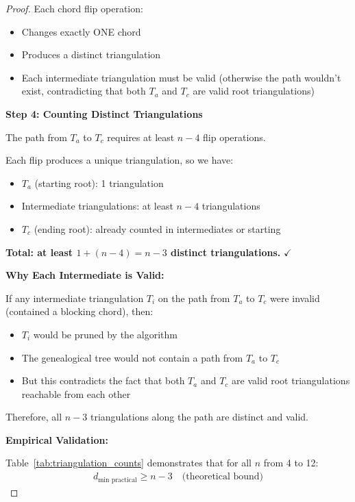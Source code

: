 \documentclass[12pt,a4paper]{article}
\theoremstyle{definition}
\theoremstyle{remark}
\begin{document}
\begin{proof}
Each chord flip operation:
\begin{itemize}
    \item Changes exactly ONE chord
    \item Produces a distinct triangulation
    \item Each intermediate triangulation must be valid (otherwise the path wouldn't exist, contradicting that both $T_a$ and $T_c$ are valid root triangulations)
\end{itemize}

\textbf{Step 4: Counting Distinct Triangulations}

The path from $T_a$ to $T_c$ requires at least $n - 4$ flip operations.

Each flip produces a unique triangulation, so we have:
\begin{itemize}
    \item $T_a$ (starting root): 1 triangulation
    \item Intermediate triangulations: at least $n - 4$ triangulations  
    \item $T_c$ (ending root): already counted in intermediates or starting
\end{itemize}

\textbf{Total: at least $1 + (n-4) = n - 3$ distinct triangulations.} $\checkmark$

\textbf{Why Each Intermediate is Valid:}

If any intermediate triangulation $T_i$ on the path from $T_a$ to $T_c$ were invalid (contained a blocking chord), then:
\begin{itemize}
    \item $T_i$ would be pruned by the algorithm
    \item The genealogical tree would not contain a path from $T_a$ to $T_c$
    \item But this contradicts the fact that both $T_a$ and $T_c$ are valid root triangulations reachable from each other
\end{itemize}

Therefore, all $n - 3$ triangulations along the path are distinct and valid.

\textbf{Empirical Validation:}

Table~\ref{tab:triangulation_counts} demonstrates that for all $n$ from 4 to 12:
\begin{align}
d_{\text{min practical}} \geq n - 3 \quad \text{(theoretical bound)}
\end{align}


\end{proof}
\end{document}

